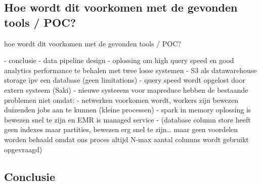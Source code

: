 \subsection{Hoe wordt dit voorkomen met de gevonden tools / POC?}
hoe wordt dit voorkomen met de gevonden tools / POC?


- conclusie
    - data pipeline design
        - oplossing om  high query speed en good analytics performance te behalen met  twee losse systemen
        - S3 als datawarehouse storage ipv een database (geen limitations)
    - query speed wordt opgelost door extern systeem (Saki)
    - nieuwe systeeem voor mapreduce hebben de bestaande problemen niet omdat:
        - netwerken voorkomen wordt, workers zijn bewezen duizenden jobs aan te kunnen (kleine processen)
        - spark in memory oplossing is bewezen snel te zijn en EMR is managed service
        - (database column store heeft geen indexes maar partities, bewezen erg snel te zijn… maar geen voordelen worden behaald omdat  ons proces altijd N-max aantal columns wordt gebruikt opgevraagd)



\subsection{Conclusie}

